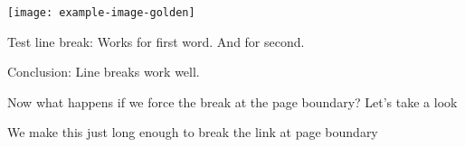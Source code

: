 \documentclass[a5paper,twocolumn]{scrartcl}
\begin{document}
  \begin{figure*}[t]
    \texttt{[image: example-image-golden]}
  \end{figure*}
  \lipsum[1]
  \lipsum[1]
  \lipsum[2]
  Test line break:
  \citep{strunk-and-white}
  Works for first word.
  \citep{strunk-and-white}
  And for second.

  Conclusion: Line breaks work well.

  Now what happens if we force the break at the page boundary?
  Let's take a look

  We make this just long enough to break the link at page boundary
  \citep{strunk-and-white}
  
\end{document}
